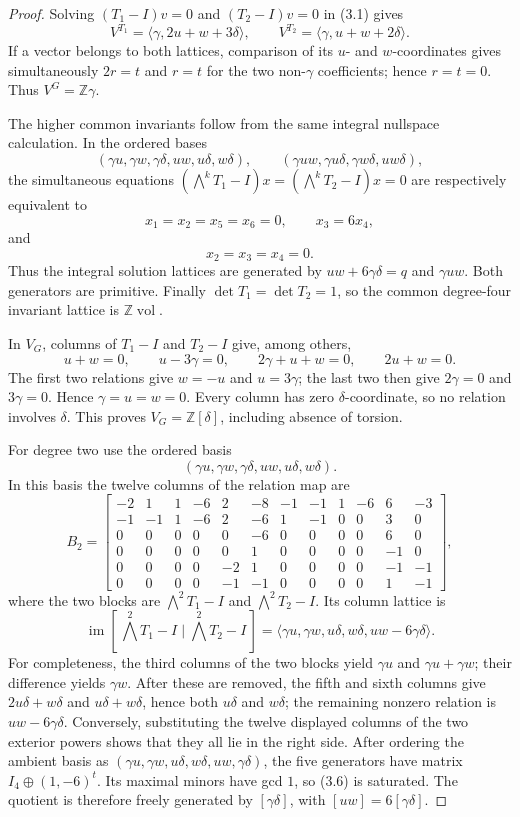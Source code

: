 \begin{proof}
Solving $(T_1-I)v=0$ and $(T_2-I)v=0$ in (3.1) gives
\[
V^{T_1}=\langle\gamma,2u+w+3\delta\rangle,\qquad
V^{T_2}=\langle\gamma,u+w+2\delta\rangle.
\]
If a vector belongs to both lattices, comparison of its $u$- and
$w$-coordinates gives simultaneously $2r=t$ and $r=t$ for the two
non-$\gamma$ coefficients; hence $r=t=0$.  Thus $V^G=\mathbb Z\gamma$.

The higher common invariants follow from the same integral nullspace
calculation.  In the ordered bases
\[
 (\gamma u,\gamma w,\gamma\delta,uw,u\delta,w\delta),
 \qquad
 (\gamma uw,\gamma u\delta,\gamma w\delta,uw\delta),
\]
the simultaneous equations
$(\bigwedge^kT_1-I)x=(\bigwedge^kT_2-I)x=0$ are respectively equivalent to
\[
 x_1=x_2=x_5=x_6=0,\qquad x_3=6x_4,
\]
and
\[
 x_2=x_3=x_4=0.
\]
Thus the integral solution lattices are generated by
$uw+6\gamma\delta=q$ and $\gamma uw$.  Both generators are primitive.
Finally $\det T_1=\det T_2=1$, so the common degree-four invariant lattice
is $\mathbb Z\operatorname{vol}$.

In $V_G$, columns of $T_1-I$ and $T_2-I$ give, among others,
\[
u+w=0,\qquad u-3\gamma=0,\qquad 2\gamma+u+w=0,
\qquad 2u+w=0.
\]
The first two relations give $w=-u$ and $u=3\gamma$; the last two then give
$2\gamma=0$ and $3\gamma=0$.  Hence $\gamma=u=w=0$.  Every column has
zero $\delta$-coordinate, so no relation involves $\delta$.  This proves
$V_G=\mathbb Z[\delta]$, including absence of torsion.

For degree two use the ordered basis
\[
(\gamma u,\gamma w,\gamma\delta,uw,u\delta,w\delta).
\]
In this basis the twelve columns of the relation map are
\[
B_2=
\left[
\begin{array}{rrrrrr|rrrrrr}
-2&1&1&-6&2&-8&-1&-1&1&-6&6&-3\\
-1&-1&1&-6&2&-6&1&-1&0&0&3&0\\
0&0&0&0&0&-6&0&0&0&0&6&0\\
0&0&0&0&0&1&0&0&0&0&-1&0\\
0&0&0&0&-2&1&0&0&0&0&-1&-1\\
0&0&0&0&-1&-1&0&0&0&0&1&-1
\end{array}
\right],
\tag{3.6a}
\]
where the two blocks are $\bigwedge^2T_1-I$ and
$\bigwedge^2T_2-I$.  Its column lattice is
\[
\operatorname{im}
[\,\textstyle\bigwedge^2T_1-I\mid\bigwedge^2T_2-I\,]
=\langle\gamma u,\gamma w,u\delta,w\delta,
          uw-6\gamma\delta\rangle .
\tag{3.6}
\]
For completeness, the third columns of the two blocks yield
$\gamma u$ and $\gamma u+\gamma w$; their difference yields $\gamma w$.
After these are removed, the fifth and sixth columns give
$2u\delta+w\delta$ and $u\delta+w\delta$, hence both
$u\delta$ and $w\delta$; the remaining nonzero relation is
$uw-6\gamma\delta$.  Conversely, substituting the twelve displayed columns
of the two exterior powers shows that they all lie in the right side.
After ordering the ambient basis as
$(\gamma u,\gamma w,u\delta,w\delta,uw,\gamma\delta)$,
the five generators have matrix $I_4\oplus(1,-6)^t$.
Its maximal minors have gcd $1$, so (3.6) is saturated.  The quotient is
therefore freely generated by $[\gamma\delta]$, with
$[uw]=6[\gamma\delta]$.


\end{proof}
